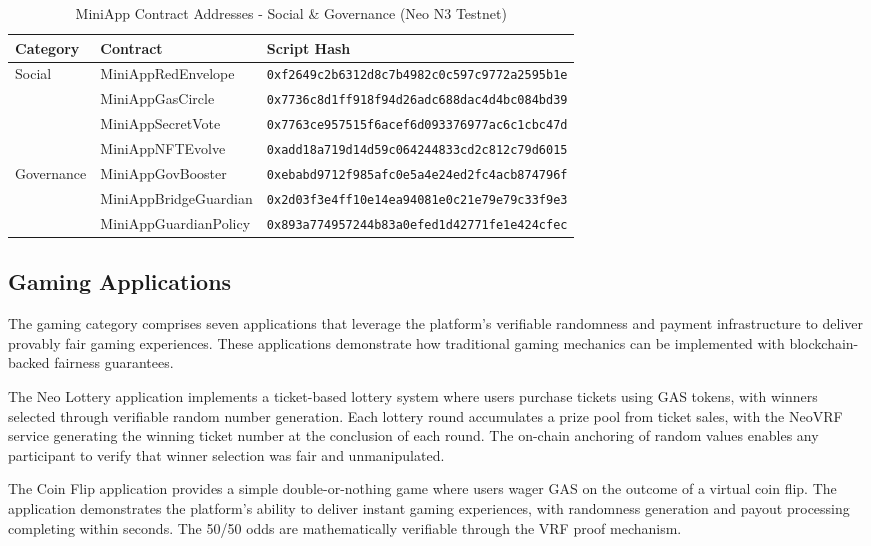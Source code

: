 \documentclass[11pt,a4paper]{article}
\begin{document}
\begin{table}[h]
\centering
\caption{MiniApp Contract Addresses - Social \& Governance (Neo N3 Testnet)}
\scriptsize
\begin{tabular}{@{}lll@{}}
\toprule
\textbf{Category} & \textbf{Contract} & \textbf{Script Hash} \\
\midrule
\multirow{4}{*}{Social} & MiniAppRedEnvelope & \texttt{0xf2649c2b6312d8c7b4982c0c597c9772a2595b1e} \\
 & MiniAppGasCircle & \texttt{0x7736c8d1ff918f94d26adc688dac4d4bc084bd39} \\
 & MiniAppSecretVote & \texttt{0x7763ce957515f6acef6d093376977ac6c1cbc47d} \\
 & MiniAppNFTEvolve & \texttt{0xadd18a719d14d59c064244833cd2c812c79d6015} \\
\midrule
\multirow{3}{*}{Governance} & MiniAppGovBooster & \texttt{0xebabd9712f985afc0e5a4e24ed2fc4acb874796f} \\
 & MiniAppBridgeGuardian & \texttt{0x2d03f3e4ff10e14ea94081e0c21e79e79c33f9e3} \\
 & MiniAppGuardianPolicy & \texttt{0x893a774957244b83a0efed1d42771fe1e424cfec} \\
\bottomrule
\end{tabular}
\label{tab:miniapps-social-gov-addresses}
\end{table}

\subsection{Gaming Applications}

The gaming category comprises seven applications that leverage the platform's verifiable randomness and payment infrastructure to deliver provably fair gaming experiences. These applications demonstrate how traditional gaming mechanics can be implemented with blockchain-backed fairness guarantees.

The Neo Lottery application implements a ticket-based lottery system where users purchase tickets using GAS tokens, with winners selected through verifiable random number generation. Each lottery round accumulates a prize pool from ticket sales, with the NeoVRF service generating the winning ticket number at the conclusion of each round. The on-chain anchoring of random values enables any participant to verify that winner selection was fair and unmanipulated.

The Coin Flip application provides a simple double-or-nothing game where users wager GAS on the outcome of a virtual coin flip. The application demonstrates the platform's ability to deliver instant gaming experiences, with randomness generation and payout processing completing within seconds. The 50/50 odds are mathematically verifiable through the VRF proof mechanism.
\end{document}
